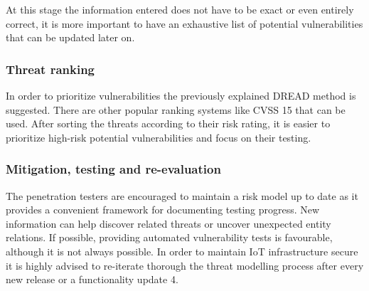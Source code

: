 	At this stage the information entered does not have to be exact or even entirely correct, it is more important to have an exhaustive list of potential vulnerabilities that can be updated later on.
	
	\subsubsection{Threat ranking}
	
	In order to prioritize vulnerabilities the previously explained DREAD method is suggested. There are other popular ranking systems like CVSS {15} that can be used. After sorting the threats according to their risk rating, it is easier to prioritize high-risk potential vulnerabilities and focus on their testing. 
	
	\subsubsection{Mitigation, testing and re-evaluation}
	
	The penetration testers are encouraged to maintain a risk model up to date as it provides a convenient framework for documenting testing progress. New information can help discover related threats or uncover unexpected entity relations. \newline
	If possible, providing automated vulnerability tests is favourable, although it is not always possible.
	In order to maintain IoT infrastructure secure it is highly advised to re-iterate thorough the threat modelling process after every new release or a functionality update {4}.
